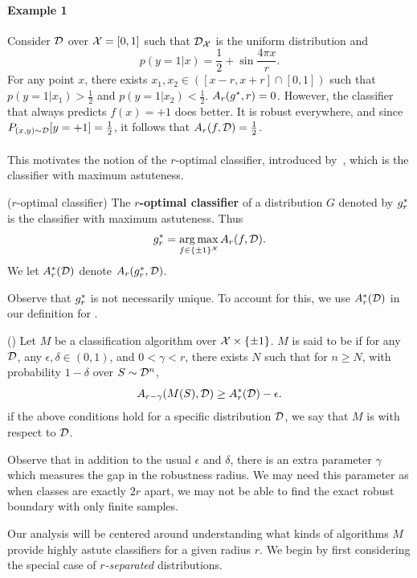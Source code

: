 \paragraph{Example 1}
Consider ${\mathcal D}$ over $\mathcal X = [0,1]$ such that ${\mathcal D}_\mathcal X$ is the uniform distribution and $$p(y=1|x) = \frac{1}{2} + \sin \frac{4 \pi x}{r}.$$ For any point $x$, there exists $x_1, x_2 \in ([x-r, x+r] \cap [0,1])$ such that $p(y=1|x_1) > \frac{1}{2}$ and $p(y=1|x_2) < \frac{1}{2}$. $A_r(g^*, r) = 0$. However, the classifier that always predicts $f(x) = +1$ does better. It is robust everywhere, and since $P_{(x,y) \sim {\mathcal D}}[y = +1] = \frac{1}{2}$, it follows that $A_r(f, {\mathcal D}) = \frac{1}{2}$. \\ \\

This motivates the notion of the $r$-optimal classifier, introduced by~\cite{YRWC19}, which is the classifier with maximum astuteness. 

\begin{defn}
($r$-optimal classifier) The \textbf{$r$-optimal classifier} of a distribution $G$ denoted by $g^*_r$ is the classifier with maximum astuteness. Thus $$g^*_r = \operatorname*{arg\,max}_{f \in \{\pm 1\}^\mathcal X} A_r(f, {\mathcal D}).$$ We let $A_r^*({\mathcal D})$ denote $A_r(g^*_r, {\mathcal D})$. 
\end{defn}

Observe that $g^*_r$ is not necessarily unique. To account for this, we use $A_r^*({\mathcal D})$ in our definition for \rconsy. 

\begin{defn} \label{defn_archons}
(\rcons) Let $M$ be a classification algorithm over $\mathcal X \times \{\pm 1\}$. $M$ is said to be \textbf{\rcons} if for any ${\mathcal D}$,  any $\epsilon, \delta \in (0,1)$, and $0 < \gamma < r$, there exists $N$ such that for $n \geq N$, with probability $1-\delta$ over $S \sim {\mathcal D}^n$, $$A_{r-\gamma}(M(S), {\mathcal D}) \geq A_r^*({\mathcal D}) - \epsilon.$$ if the above conditions hold for a specific distribution ${\mathcal D}$, we say that $M$ is \rcons\emph{ }with respect to ${\mathcal D}$. 
\end{defn}

Observe that in addition to the usual $\epsilon$ and $\delta$, there is an extra parameter $\gamma$ which measures the gap in the robustness radius. We may need this parameter as when classes are exactly $2r$ apart, we may not be able to find the exact robust boundary with only finite samples. 

Our analysis will be centered around understanding what kinds of algorithms $M$ provide highly astute classifiers for a given radius $r$. We begin by first considering the special case of \textit{$r$-separated} distributions. 

